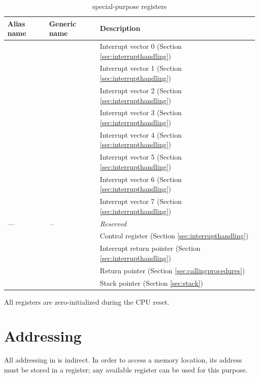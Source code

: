 \documentclass[a4paper,12pt,twoside,extrafontsizes]{memoir}
\begin{document}
\begin{table}[htbp]
	\caption{\lxp{} special-purpose registers}
	\label{tab:spr}
	\begin{tabularx}{\textwidth}{llL}
		\toprule
		Alias name & Generic name & Description \\
		\midrule
		 &  & Interrupt vector 0 (Section \ref{sec:interrupthandling}) \\
		 &  & Interrupt vector 1 (Section \ref{sec:interrupthandling}) \\
		 &  & Interrupt vector 2 (Section \ref{sec:interrupthandling}) \\
		 &  & Interrupt vector 3 (Section \ref{sec:interrupthandling}) \\
		 &  & Interrupt vector 4 (Section \ref{sec:interrupthandling}) \\
		 &  & Interrupt vector 5 (Section \ref{sec:interrupthandling}) \\
		 &  & Interrupt vector 6 (Section \ref{sec:interrupthandling}) \\
		 &  & Interrupt vector 7 (Section \ref{sec:interrupthandling}) \\
		 & \,--\, & \emph{Reserved} \\
		  &  & Control register (Section \ref{sec:interrupthandling}) \\
		 &  & Interrupt return pointer (Section \ref{sec:interrupthandling}) \\
		  &  & Return pointer (Section \ref{sec:callingprocedures})\\
		  &  & Stack pointer (Section \ref{sec:stack}) \\
		\bottomrule
	\end{tabularx}
\end{table}

All registers are zero-initialized during the CPU reset.

\section{Addressing}
\label{sec:addressing}

All addressing in \lxp{} is indirect. In order to access a memory location, its address must be stored in a register; any available register can be used for this purpose.
\end{document}
